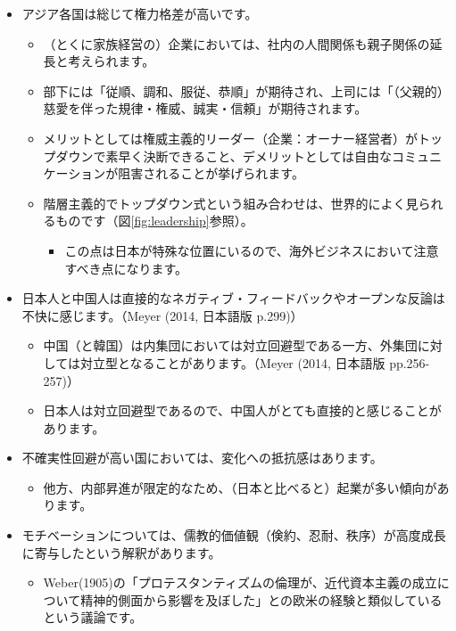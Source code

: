 \documentclass[
]{book}
\providecommand{\tightlist}{%
  \setlength{\itemsep}{0pt}\setlength{\parskip}{0pt}}
\begin{document}
\begin{itemize}
\item
  アジア各国は総じて権力格差が高いです。

  \begin{itemize}
  \item
    （とくに家族経営の）企業においては、社内の人間関係も親子関係の延長と考えられます。
  \item
    部下には「従順、調和、服従、恭順」が期待され、上司には「（父親的）慈愛を伴った規律・権威、誠実・信頼」が期待されます。
  \item
    メリットとしては権威主義的リーダー（企業：オーナー経営者）がトップダウンで素早く決断できること、デメリットとしては自由なコミュニケーションが阻害されることが挙げられます。
  \item
    階層主義的でトップダウン式という組み合わせは、世界的によく見られるものです（図\ref{fig:leadership}参照）。

    \begin{itemize}
    \tightlist
    \item
      この点は日本が特殊な位置にいるので、海外ビジネスにおいて注意すべき点になります。
    \end{itemize}
  \end{itemize}
\item
  日本人と中国人は直接的なネガティブ・フィードバックやオープンな反論は不快に感じます。（Meyer (2014, 日本語版 p.299)）

  \begin{itemize}
  \item
    中国（と韓国）は内集団においては対立回避型である一方、外集団に対しては対立型となることがあります。（Meyer (2014, 日本語版 pp.256-257)）
  \item
    日本人は対立回避型であるので、中国人がとても直接的と感じることがあります。
  \end{itemize}
\item
  不確実性回避が高い国においては、変化への抵抗感はあります。

  \begin{itemize}
  \tightlist
  \item
    他方、内部昇進が限定的なため、（日本と比べると）起業が多い傾向があります。
  \end{itemize}
\item
  モチベーションについては、儒教的価値観（倹約、忍耐、秩序）が高度成長に寄与したという解釈があります。

  \begin{itemize}
  \tightlist
  \item
    Weber(1905)の「プロテスタンティズムの倫理が、近代資本主義の成立について精神的側面から影響を及ぼした」との欧米の経験と類似しているという議論です。
  \end{itemize}
\end{itemize}
\end{document}
